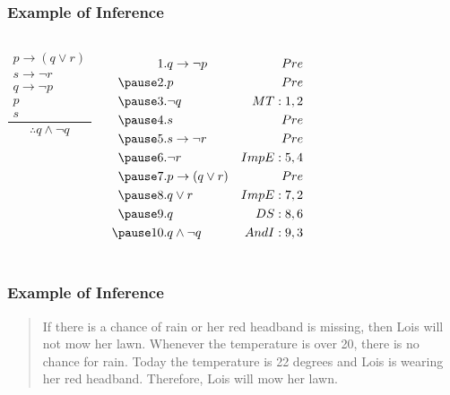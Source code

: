 \documentclass[dvipsnames]{beamer}
\begin{document}
\begin{frame}
  \frametitle{Example of Inference}

  \begin{example}
    \begin{columns}
      \[
      \frac
        {
          \begin{array}{c}
            p \rightarrow (q \vee r)\\
            s \rightarrow \neg r\\
            q \rightarrow \neg p\\
            p\\
            s
          \end{array}
        }
        {
          \therefore q \wedge \neg q
        }
      \]

      \pause
      \begin{eqnarray*}
        1. & q \rightarrow \neg p     & Pre\\
       \pause
        2. & p                        & Pre\\
       \pause
        3. & \neg q                   & MT:1,2\\
       \pause
        4. & s                        & Pre\\
       \pause
        5. & s \rightarrow \neg r     & Pre\\
       \pause
        6. & \neg r                   & ImpE:5,4\\
       \pause
        7. & p \rightarrow (q \vee r) & Pre\\
       \pause
        8. & q \vee r                 & ImpE:7,2\\
       \pause
        9. & q                        & DS:8,6\\
       \pause
       10. & q \wedge \neg q          & AndI:9,3
      \end{eqnarray*}
    \end{columns}
  \end{example}
\end{frame}

\begin{frame}
  \frametitle{Example of Inference}

  \begin{example}
    \begin{quote}
      If there is a chance of rain or her red headband is missing, then Lois
      will not mow her lawn. Whenever the temperature is over 20, there is no
      chance for rain. Today the temperature is 22 degrees and Lois is wearing
      her red headband. Therefore, Lois will mow her lawn.
    \end{quote}
  \end{example}
\end{frame}
\end{document}
